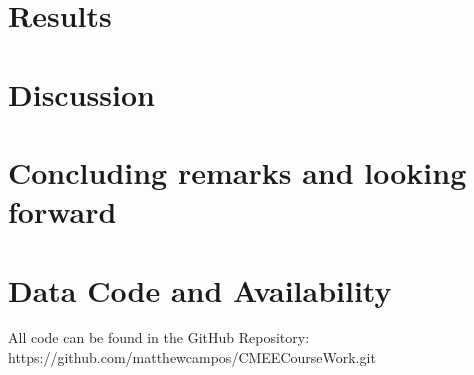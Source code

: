 \documentclass[11pt]{article}
\begin{document}
\section{Results}


\section{Discussion}


\section{Concluding remarks and looking forward}


\newpage

\section{Data Code and Availability}
All code can be found in the GitHub Repository:\\
{https://github.com/matthewcampos/CMEECourseWork.git}

\newpage




\newpage
\end{document}

